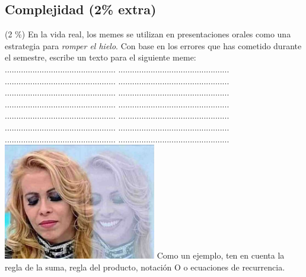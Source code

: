\documentclass[10 pt]{article}
\begin{document}
\begin{multicols}{2}
\section{Complejidad (2\% extra)}
 (2 \%) En la vida real, los memes se utilizan en presentaciones orales como una estrategia para \textit{romper el hielo}. Con base en los errores que has cometido durante el semestre,
escribe un texto para el siguiente meme:\\
................................................     ................................................\\
................................................     ................................................\\
................................................     ................................................\\
................................................     ................................................\\
................................................     ................................................\\
................................................     ................................................\\
................................................     ................................................\\
\includegraphics[width=0.5\textwidth]{AAHRBRo.jpeg}
Como un ejemplo, ten en cuenta la regla de la suma, regla del producto,
notación O o ecuaciones de recurrencia.

\end{multicols}
\end{document}
